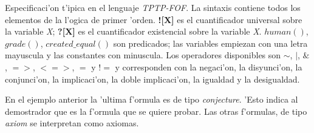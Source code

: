 Especificaci'on t'ipica en el lenguaje \textit{TPTP-FOF}. La sintaxis contiene todos los elementos de la l'ogica de primer 'orden. \textbf{![X]} es el cuantificador universal sobre la variable \textit{X}; \textbf{?[X]} es el cuantificador existencial sobre la variable \textit{X}. \textit{$human()$}, \textit{$grade()$}, \textit{$created\_equal()$} son predicados; las variables empiezan con una letra mayuscula y las constantes con minuscula. Los operadores disponibles son $\sim$, $|$, $\&$, $=>$, $<=>$, $=$ y $!=$ y corresponden con la negaci'on, la disyunci'on, la conjunci'on, la implicaci'on, la doble implicaci'on, la igualdad y la desigualdad.

En el ejemplo anterior la 'ultima f'ormula es de tipo \textit{conjecture}. 'Esto indica al demostrador que es la f'ormula que se quiere probar. Las otras f'ormulas, de tipo \textit{axiom} se interpretan como axiomas.

